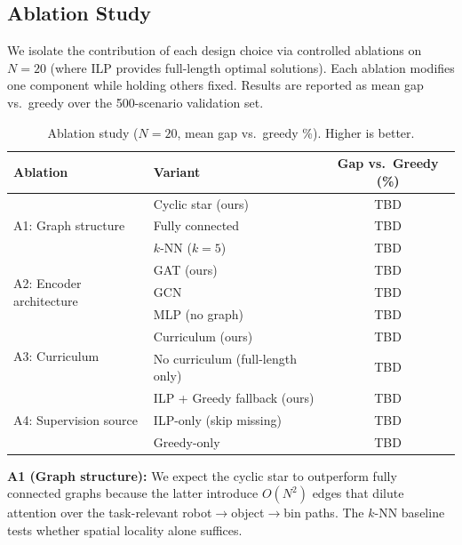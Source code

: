 \documentclass[conference]{IEEEtran}
\begin{document}
\subsection{Ablation Study}\label{sec:ablations}

We isolate the contribution of each design choice via controlled ablations on $N{=}20$ (where ILP provides full-length optimal solutions). Each ablation modifies one component while holding others fixed. Results are reported as mean gap vs.\ greedy over the 500-scenario validation set.


\begin{table}[htbp]
\caption{Ablation study ($N{=}20$, mean gap vs.\ greedy \%). Higher is better.}
\label{tab:ablations}
\centering
\begin{tabular}{@{}llc@{}}
\toprule
\textbf{Ablation} & \textbf{Variant} & \textbf{Gap vs.\ Greedy (\%)} \\
\midrule
\multirow{3}{*}{A1: Graph structure}
    & Cyclic star (ours) & TBD \\
    & Fully connected & TBD \\
    & $k$-NN ($k{=}5$) & TBD \\
\cmidrule(l){2-3}
\multirow{3}{*}{A2: Encoder architecture}
    & GAT (ours) & TBD \\
    & GCN & TBD \\
    & MLP (no graph) & TBD \\
\cmidrule(l){2-3}
\multirow{2}{*}{A3: Curriculum}
    & Curriculum (ours) & TBD \\
    & No curriculum (full-length only) & TBD \\
\cmidrule(l){2-3}
\multirow{3}{*}{A4: Supervision source}
    & ILP + Greedy fallback (ours) & TBD \\
    & ILP-only (skip missing) & TBD \\
    & Greedy-only & TBD \\
\bottomrule
\end{tabular}
\end{table}

\textbf{A1 (Graph structure):} We expect the cyclic star to outperform fully connected graphs because the latter introduce $O(N^2)$ edges that dilute attention over the task-relevant robot$\to$object$\to$bin paths. The $k$-NN baseline tests whether spatial locality alone suffices.
\end{document}
